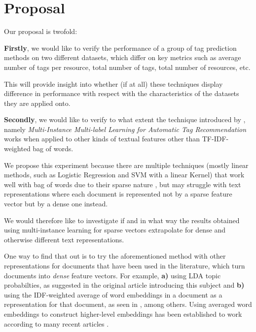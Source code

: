 \chapter{Proposal}\label{chap:proposal}

Our proposal is twofold:

\textbf{Firstly}, we would like to verify the performance of a group of tag prediction methods on two different datasets, which differ on key metrics such as average number of tags per resource, total number of tags, total number of resources, etc.

This will provide insight into whether (if at all)  these techniques display difference in performance with respect with the characteristics of the datasets they are applied onto.

\textbf{Secondly}, we would like to verify to what extent the technique introduced by \cite{shen_etal_2009}, namely \textit{Multi-Instance Multi-label Learning for Automatic Tag Recommendation} works when applied to other kinds of textual features other than TF-IDF-weighted bag of words.

We propose this experiment because there are multiple techniques (mostly linear methods, such as Logistic Regression and SVM with a linear Kernel) that work well with bag of words due to their sparse nature \citep{hsu_etal_2010, li_etal_2015}, but may struggle with text representations where each document is represented not by a sparse feature vector but by a dense one instead.

We would therefore like to investigate if and in what way the results obtained using multi-instance learning for sparse vectors extrapolate for dense and otherwise different text representations.

One way to find that out is to try the aforementioned method with other representations for documents that have been used in the literature, which turn documents into \textit{dense} feature vectors. For example, \textbf{a)} using LDA topic probabilties, as suggested in the original article introducing this subject \citep{blei_etal_2003} and \textbf{b)} using the IDF-weighted average of word embeddings in a document as a representation for that document, as seen in \cite{zhao_etal_2015,correa_etal_2017}, among others. Using averaged word embeddings to construct higher-level embeddings has been established to work according to many recent articles \citep{wieting_etal_2016,arora_etal_2017}.


